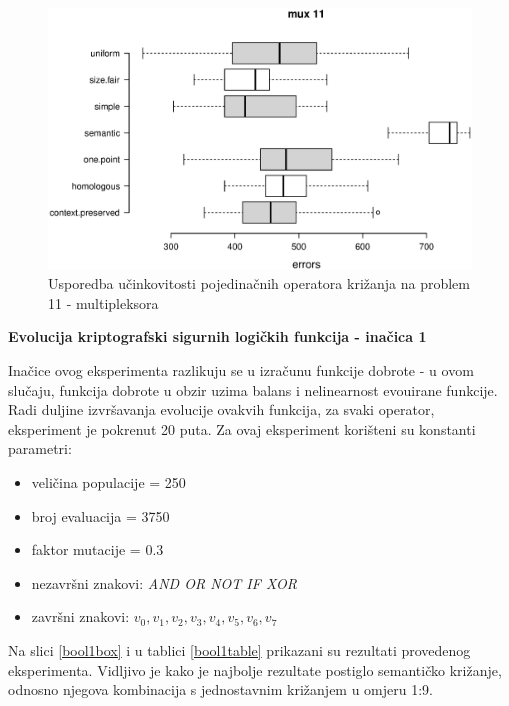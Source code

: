 \begin{figure}[H]
	\centering
	\includegraphics[trim=0cm 4cm 0cm 0cm, scale=0.6]{./slike/boxPlots/mux11.eps}
	\caption{Usporedba učinkovitosti pojedinačnih operatora križanja na problem 11 - multipleksora}
	\label{mux11box}
\end{figure}

\textbf{Evolucija kriptografski sigurnih logičkih funkcija - inačica 1}

Inačice ovog eksperimenta razlikuju se u izračunu funkcije dobrote - u ovom slučaju, funkcija dobrote u obzir uzima balans i nelinearnost evouirane funkcije. Radi duljine izvršavanja evolucije ovakvih funkcija, za svaki operator, eksperiment je pokrenut 20 puta. Za ovaj eksperiment korišteni su konstanti parametri:
\begin{itemize}
\item{veličina populacije = 250}
\item{broj evaluacija = 3750}
\item{faktor mutacije = 0.3}
\item{nezavršni znakovi: \textit{AND OR NOT IF XOR}}
\item{završni znakovi: \textit{$v_0, v_1, v_2, v_3, v_4, v_5, v_6, v_7$}}
\end{itemize}

Na slici \ref{bool1box} i u tablici \ref{bool1table} prikazani su rezultati provedenog eksperimenta. Vidljivo je kako je najbolje rezultate postiglo semantičko križanje, odnosno njegova kombinacija s jednostavnim križanjem u omjeru 1:9.

